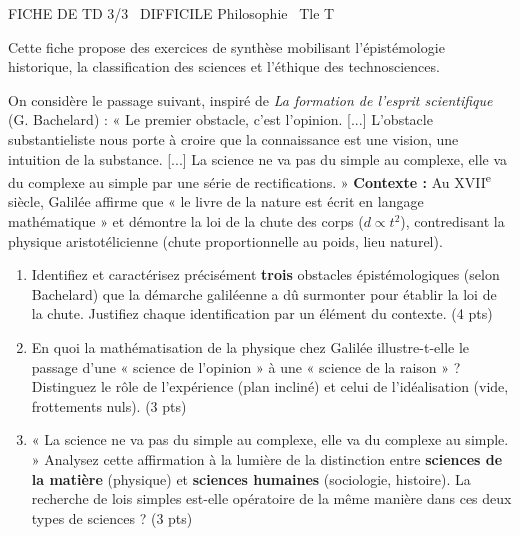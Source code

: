 \documentclass[11pt]{article}
\begin{document}
\begin{tcolorbox}[enhanced,colback=popink,colframe=popink,arc=10pt,boxrule=0pt,left=12pt,right=12pt,top=9pt,bottom=9pt]
{\color{white}\popxbold\small FICHE DE TD 3/3 \textbullet\ DIFFICILE \hfill Philosophie \textbullet\ Tle T\par}
\end{tcolorbox}
\vspace{4pt}
Cette fiche propose des exercices de synthèse mobilisant l'épistémologie historique, la classification des sciences et l'éthique des technosciences.

\begin{exercice}
On considère le passage suivant, inspiré de \textit{La formation de l'esprit scientifique} (G. Bachelard) : « Le premier obstacle, c'est l'opinion. [...] L'obstacle substantieliste nous porte à croire que la connaissance est une vision, une intuition de la substance. [...] La science ne va pas du simple au complexe, elle va du complexe au simple par une série de rectifications. »
\textbf{Contexte :} Au XVII\textsuperscript{e} siècle, Galilée affirme que « le livre de la nature est écrit en langage mathématique » et démontre la loi de la chute des corps ($d \propto t^2$), contredisant la physique aristotélicienne (chute proportionnelle au poids, lieu naturel).
\begin{enumerate}
    \item Identifiez et caractérisez précisément \textbf{trois} obstacles épistémologiques (selon Bachelard) que la démarche galiléenne a dû surmonter pour établir la loi de la chute. Justifiez chaque identification par un élément du contexte. \hfill (4 pts)
    \item En quoi la mathématisation de la physique chez Galilée illustre-t-elle le passage d'une « science de l'opinion » à une « science de la raison » ? Distinguez le rôle de l'expérience (plan incliné) et celui de l'idéalisation (vide, frottements nuls). \hfill (3 pts)
    \item « La science ne va pas du simple au complexe, elle va du complexe au simple. » Analysez cette affirmation à la lumière de la distinction entre \textbf{sciences de la matière} (physique) et \textbf{sciences humaines} (sociologie, histoire). La recherche de lois simples est-elle opératoire de la même manière dans ces deux types de sciences ? \hfill (3 pts)
\end{enumerate}
\end{exercice}
\end{document}
